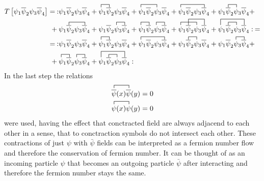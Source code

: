 \begin{align*}
		T\left[\psi_1\overline{\psi}_2\psi_3\overline{\psi}_4\right]=\:
		:&\psi_1\overline{\psi}_2\psi_3\overline{\psi}_4+
		\contraction{}{\psi}{{}_1}{\psi}\psi_1\overline{\psi}_2\psi_3\overline{\psi}_4+
		\contraction{}{\psi}{\psi_2{}_3}{\psi}\psi_1\overline{\psi}_2\psi_3\overline{\psi}_4+
		\contraction{}{\psi}{\psi_2\psi_3{}_4}{\psi}\psi_1\overline{\psi}_2\psi_3\overline{\psi}_4+
		\contraction{\psi_1}{\psi}{{}_1}{\psi}\psi_1\overline{\psi}_2\psi_3\overline{\psi}_4+\\
		+\:\contraction{\psi_1}{\psi}{\psi_2{}_3}{\psi}&\psi_1\overline{\psi}_2\psi_3\overline{\psi}_4+
		\contraction{\psi_1\psi_2}{\psi}{{}_4}{\psi}\psi_1\overline{\psi}_2\psi_3\overline{\psi}_4+
		\contraction{}{\psi}{{}_1}{\bar{\psi}}\contraction{\psi_1\psi_2}{\psi}{{}_3}{\bar{\psi}}\psi_1\overline{\psi}_2\psi_3\overline{\psi}_4+
		\contraction{}{\psi}{{}_1\psi_2}{\psi}\contraction[2ex]{\psi_1}{\psi}{{}_2\psi_3}{\psi}\psi_1\overline{\psi}_2\psi_3\overline{\psi}_4+
		\contraction[2ex]{}{\psi}{{}_1\psi_2\psi_3}{\psi}\contraction{\psi_1}{\psi}{{}_2}{\psi}\psi_1\overline{\psi}_2\psi_3\overline{\psi}_4:\:=\\
		=\::&\psi_1\overline{\psi}_2\psi_3\overline{\psi}_4+\contraction{}{\psi}{{}_1}{\psi}\psi_1\overline{\psi}_2\psi_3\overline{\psi}_4+\contraction{}{\psi}{\psi_2\psi_3{}_4}{\psi}\psi_1\overline{\psi}_2\psi_3\overline{\psi}_4+\contraction{\psi_1}{\psi}{{}_1}{\psi}\psi_1\overline{\psi}_2\psi_3\overline{\psi}_4+\contraction{\psi_1\psi_2}{\psi}{{}_4}{\psi}\psi_1\overline{\psi}_2\psi_3\overline{\psi}_4+\\
		+\:\contraction{}{\psi}{{}_1}{\bar{\psi}}\contraction{\psi_1\psi_2}{\psi}{{}_3}{\bar{\psi}}&\psi_1\overline{\psi}_2\psi_3\overline{\psi}_4+\contraction[2ex]{}{\psi}{{}_1\psi_2\psi_3}{\psi}\contraction{\psi_1}{\psi}{{}_2}{\psi}\psi_1\overline{\psi}_2\psi_3\overline{\psi}_4:
\end{align*}
In the last step the relations
\begin{align}
	\contraction{}{\overline{\psi}}{(x)}{\bar{\psi}}
	\overline{{\psi}}(x)\overline{\psi}(y)=0
	\label{eq:selfcontraction1}
	\\
	\contraction{}{\psi}{(x)}{\psi}
	\psi(x)\psi(y)=0
	\label{eq:selfcontraction2}
\end{align}
were used, having the effect that conctracted field are always adjacend to each other in a sense, that to conctraction symbols do not intersect each other. These contractions of just $\psi$ with $\bar{\psi}$ fields can be interpreted as a fermion number flow and therefore the conservation of fermion number. It can be thought of as an incoming particle $\psi$ that becomes an outgoing particle $\bar{\psi}$ after interacting and therefore the fermion number stays the same.\newline
